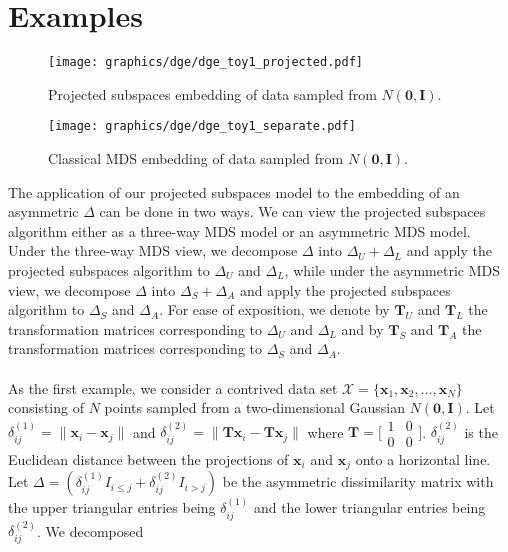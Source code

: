\section{Examples}
\label{sec:examples}
\begin{figure}[htbp]
  \centering
  \texttt{[image: graphics/dge/dge\_toy1\_projected.pdf]}
  \caption{Projected subspaces embedding of data sampled from
    $N(\mathbf{0}, \mathbf{I})$. }
  \label{fig:toy1_projected}
\end{figure}
\begin{figure}
  \centering
  \texttt{[image: graphics/dge/dge\_toy1\_separate.pdf]}
  \caption{Classical MDS embedding of data sampled from $N(\mathbf{0},
    \mathbf{I})$.}
  \label{fig:toy1_cmds}
\end{figure}
%
%
The application of our projected subspaces model to the embedding of
an asymmetric $\Delta$ can be done in two ways. We can view the
projected subspaces algorithm either as a three-way MDS model or an
asymmetric MDS model. Under the three-way MDS view, we decompose
$\Delta$ into $\Delta_U + \Delta_L$ and apply the projected subspaces
algorithm to $\Delta_U$ and $\Delta_L$, while under the asymmetric MDS
view, we decompose $\Delta$ into $\Delta_S + \Delta_A$ and apply the
projected subspaces algorithm to $\Delta_S$ and $\Delta_A$. For ease
of exposition, we denote by $\mathbf{T}_U$ and $\mathbf{T}_L$ the
transformation matrices corresponding to $\Delta_U$ and $\Delta_L$ and
by $\mathbf{T}_S$ and $\mathbf{T}_A$ the transformation matrices
corresponding to $\Delta_S$ and $\Delta_A$.  \\ \\
\noindent
As the first example, we consider a contrived data set $\mathcal{X} =
\{\mathbf{x}_1, \mathbf{x}_2, \dots, \mathbf{x}_N\}$ consisting of $N$
points sampled from a two-dimensional Gaussian $N(\mathbf{0},
\mathbf{I})$. Let $\delta_{ij}^{(1)} = \| \mathbf{x}_i - \mathbf{x}_j
\|$ and $\delta_{ij}^{(2)} = \| \mathbf{T}\mathbf{x}_i -
\mathbf{T}\mathbf{x}_j \|$ where $\mathbf{T} =
\bigl[\begin{smallmatrix} 1 & 0 \\ 0 & 0 \end{smallmatrix}
\bigr]$. $\delta_{ij}^{(2)}$ is the Euclidean distance between the
projections of $\mathbf{x}_i$ and $\mathbf{x}_j$ onto a horizontal
line. Let $\Delta = (\delta_{ij}^{(1)} I_{i \leq j} +
\delta_{ij}^{(2)} I_{i > j})$ be the asymmetric dissimilarity matrix
with the upper triangular entries being $\delta_{ij}^{(1)}$ and the
lower triangular entries being $\delta_{ij}^{(2)}$. We decomposed
